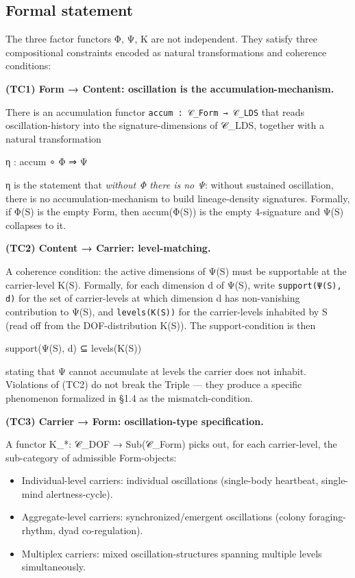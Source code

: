 \documentclass[11pt, openany]{book}
\begin{document}
\subsection{Formal statement}

The three factor functors Φ, Ψ, Κ are not independent. They satisfy three compositional constraints encoded as natural transformations and coherence conditions:

\textbf{(TC1) Form → Content: oscillation is the accumulation-mechanism.}

There is an accumulation functor \texttt{accum : 𝒞\_Form → 𝒞\_LDS} that reads oscillation-history into the signature-dimensions of 𝒞\_\allowbreak{}LDS, together with a natural transformation

\begin{Code}
η : accum ∘ Φ ⇒ Ψ
\end{Code}

η is the statement that \textit{without Φ there is no Ψ}: without sustained oscillation, there is no accumulation-mechanism to build lineage-density signatures. Formally, if Φ(S) is the empty Form, then accum(Φ(S)) is the empty 4-signature and Ψ(S) collapses to it.

\textbf{(TC2) Content → Carrier: level-matching.}

A coherence condition: the active dimensions of Ψ(S) must be supportable at the carrier-level Κ(S). Formally, for each dimension d of Ψ(S), write \texttt{support(Ψ(S), d)} for the set of carrier-levels at which dimension d has non-vanishing contribution to Ψ(S), and \texttt{levels(Κ(S))} for the carrier-levels inhabited by S (read off from the DOF-distribution Κ(S)). The support-condition is then

\begin{Code}
support(Ψ(S), d) ⊆ levels(Κ(S))
\end{Code}

stating that Ψ cannot accumulate at levels the carrier does not inhabit. Violations of (TC2) do not break the Triple --- they produce a specific phenomenon formalized in §1.4 as the mismatch-condition.

\textbf{(TC3) Carrier → Form: oscillation-type specification.}

A functor Κ\_\allowbreak{}*: 𝒞\_\allowbreak{}DOF → Sub(𝒞\_\allowbreak{}Form) picks out, for each carrier-level, the sub-category of admissible Form-objects:

\begin{itemize}
\item Individual-level carriers: individual oscillations (single-body heartbeat, single-mind alertness-cycle).
\item Aggregate-level carriers: synchronized/emergent oscillations (colony foraging-rhythm, dyad co-regulation).
\item Multiplex carriers: mixed oscillation-structures spanning multiple levels simultaneously.
\end{itemize}
\end{document}
